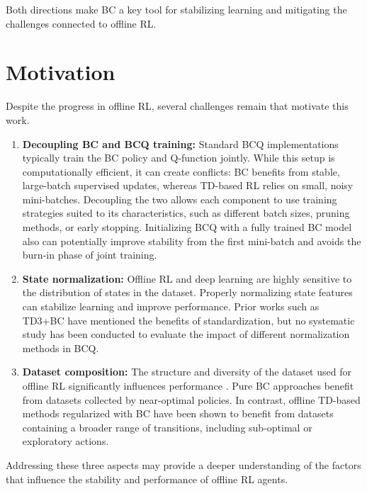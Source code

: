 Both directions make BC a key tool for stabilizing learning and mitigating the challenges connected to offline RL.




\section{Motivation}

Despite the progress in offline RL, several challenges remain that motivate this work. 
\begin{enumerate}
    \item \textbf{Decoupling BC and BCQ training:}  
    Standard BCQ implementations \cite{BCQ_benchmarking} typically train the BC policy and Q-function jointly. While this setup is computationally efficient, it can create conflicts: BC benefits from stable, large-batch supervised updates, whereas TD-based RL relies on small, noisy mini-batches. Decoupling the two allows each component to use training strategies suited to its characteristics, such as different batch sizes, pruning methods, or early stopping. Initializing BCQ with a fully trained BC model also can potentially improve stability from the first mini-batch and avoids the burn-in phase of joint training.
    
    \item \textbf{State normalization:}  
    Offline RL and deep learning are highly sensitive to the distribution of states in the dataset. Properly normalizing state features can stabilize learning and improve performance. Prior works such as TD3+BC \cite{fujimoto2021minimalist} have mentioned the benefits of standardization, but no systematic study has been conducted to evaluate the impact of different normalization methods in BCQ.

    \item \textbf{Dataset composition:}  
    The structure and diversity of the dataset used for offline RL significantly influences performance \cite{dataset_composition_rl_effects}. Pure BC approaches benefit from datasets collected by near-optimal policies. In contrast, offline TD-based methods regularized with BC have been shown to benefit from datasets containing a broader range of transitions, including sub-optimal or exploratory actions.
\end{enumerate}

Addressing these three aspects may provide a deeper understanding of the factors that influence the stability and performance of offline RL agents.







